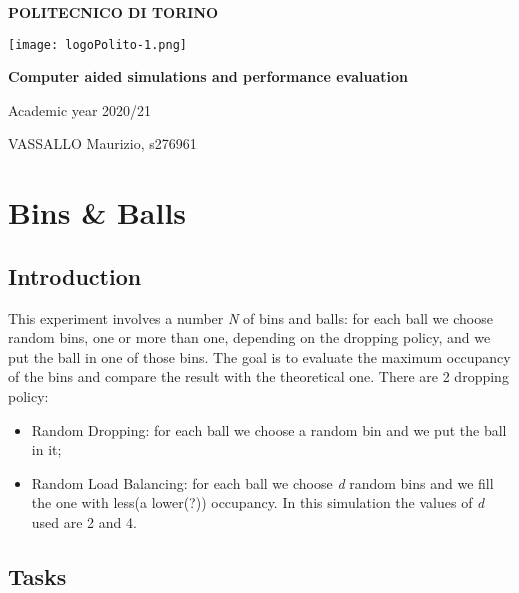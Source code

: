 \documentclass{report}
\begin{document}
\begin{titlepage}
   \begin{center}
       \LARGE
       \textbf{POLITECNICO DI TORINO}
       \vspace{1cm}
       
       \texttt{[image: logoPolito-1.png]}
       \vspace{0.8cm}
       
        \textbf{Computer aided simulations and performance evaluation}
       \vspace{1.5cm}
       
       Academic year 2020/21
       \vfill
       \begin{flushright}
       			\large
            VASSALLO Maurizio, s276961
       \end{flushright}
   \end{center}
\end{titlepage}

\tableofcontents

\chapter{Bins \& Balls}
	 
	\section{Introduction}
	 
	This experiment involves a number \emph{N} of bins and balls: for each ball we choose random bins, one or more than one, depending on the dropping policy, and we put the ball in one of those bins. The goal is to evaluate the maximum occupancy of the bins and compare the result with the theoretical one. There are 2 dropping policy:
	\begin{itemize}
		\item Random Dropping: for each ball we choose a random bin and we put the ball in it; 
		\item Random Load Balancing: for each ball we choose \emph{d} random bins and we fill the one with less(a lower(?)) occupancy. In this simulation the values of \emph{d} used are 2 and 4.
	\end{itemize}

	\section{Tasks}
	 
\end{document}
